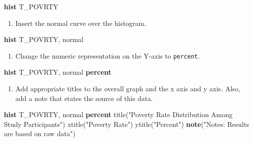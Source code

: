 \documentclass[
]{book}
\newenvironment{Shaded}{\begin{snugshade}}{\end{snugshade}}
\newcommand{\BaseNTok}[1]{\textcolor[rgb]{0.00,0.00,0.81}{#1}}
\newcommand{\FunctionTok}[1]{\textcolor[rgb]{0.00,0.00,0.00}{#1}}
\newcommand{\KeywordTok}[1]{\textcolor[rgb]{0.13,0.29,0.53}{\textbf{#1}}}
\newcommand{\NormalTok}[1]{#1}
\newcommand{\StringTok}[1]{\textcolor[rgb]{0.31,0.60,0.02}{#1}}
\providecommand{\tightlist}{%
  \setlength{\itemsep}{0pt}\setlength{\parskip}{0pt}}
\begin{document}
\begin{Shaded}
\begin{Highlighting}[]
\KeywordTok{hist}\NormalTok{ T\_POVRTY}
\end{Highlighting}
\end{Shaded}

\begin{enumerate}
\def\labelenumi{\arabic{enumi}.}
\setcounter{enumi}{2}
\tightlist
\item
  Insert the normal curve over the histogram.
\end{enumerate}

\begin{Shaded}
\begin{Highlighting}[]
\KeywordTok{hist}\NormalTok{ T\_POVRTY, }\FunctionTok{normal}
\end{Highlighting}
\end{Shaded}

\begin{enumerate}
\def\labelenumi{\arabic{enumi}.}
\setcounter{enumi}{3}
\tightlist
\item
  Change the numeric representation on the Y-axis to \texttt{percent}.
\end{enumerate}

\begin{Shaded}
\begin{Highlighting}[]
\KeywordTok{hist}\NormalTok{ T\_POVRTY, }\FunctionTok{normal} \KeywordTok{percent}
\end{Highlighting}
\end{Shaded}

\begin{enumerate}
\def\labelenumi{\arabic{enumi}.}
\setcounter{enumi}{4}
\tightlist
\item
  Add appropriate titles to the overall graph and the x axis and y axis. Also, add a note that states the source of this data.
\end{enumerate}

\begin{Shaded}
\begin{Highlighting}[]
\KeywordTok{hist}\NormalTok{ T\_POVRTY, }\FunctionTok{normal} \KeywordTok{percent} \BaseNTok{title}\NormalTok{(}\StringTok{"Poverty Rate Distribution Among Study Participants"}\NormalTok{) }\BaseNTok{xtitle}\NormalTok{(}\StringTok{"Poverty Rate"}\NormalTok{) }\BaseNTok{ytitle}\NormalTok{(}\StringTok{"Percent"}\NormalTok{) }\KeywordTok{note}\NormalTok{(}\StringTok{"Notes: Results are based on raw data"}\NormalTok{)}
\end{Highlighting}
\end{Shaded}
\end{document}
